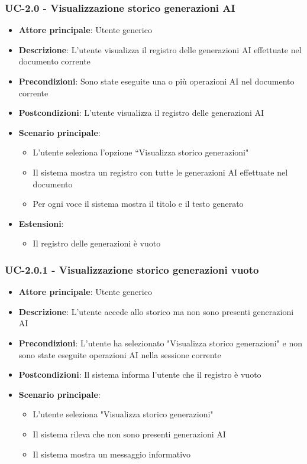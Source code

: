 \documentclass[11pt,a4paper]{article}
\begin{document}
\subsubsection{UC-2.0 - Visualizzazione storico generazioni AI}
\begin{itemize}
    \item \textbf{Attore principale}: Utente generico
    \item \textbf{Descrizione}: L'utente visualizza il registro delle generazioni AI effettuate nel documento corrente
    \item \textbf{Precondizioni}: Sono state eseguite una o più operazioni AI nel documento corrente
    \item \textbf{Postcondizioni}: L’utente visualizza il registro delle generazioni AI
    \item \textbf{Scenario principale}:
        \begin{itemize}
            \item L’utente seleziona l’opzione “Visualizza storico generazioni"
            \item Il sistema mostra un registro con tutte le generazioni AI effettuate nel documento
            \item Per ogni voce il sistema mostra il titolo e il testo generato
        \end{itemize}
        \item \textbf{Estensioni}:
        \begin{itemize}
            \item Il registro delle generazioni è vuoto
        \end{itemize}
\end{itemize}

\subsubsection{UC-2.0.1 - Visualizzazione storico generazioni vuoto}
\begin{itemize}
    \item \textbf{Attore principale}: Utente generico
    \item \textbf{Descrizione}: L'utente accede allo storico ma non sono presenti generazioni AI
    \item \textbf{Precondizioni}: L'utente ha selezionato "Visualizza storico generazioni" e non sono state eseguite operazioni AI nella sessione corrente
    \item \textbf{Postcondizioni}: Il sistema informa l'utente che il registro è vuoto
    \item \textbf{Scenario principale}:
        \begin{itemize}
            \item L'utente seleziona "Visualizza storico generazioni"
            \item Il sistema rileva che non sono presenti generazioni AI
            \item Il sistema mostra un messaggio informativo
        \end{itemize}
\end{itemize}
\end{document}
